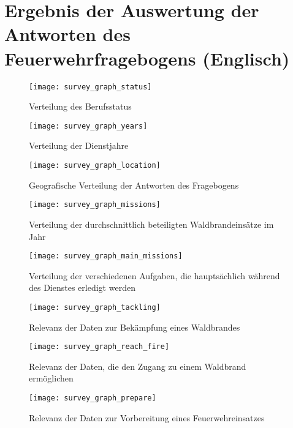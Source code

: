 \section{Ergebnis der Auswertung der Antworten des Feuerwehrfragebogens (Englisch)} \label{appendix:firefighter_survey}

\begin{figure}[H]
  \centering
  \texttt{[image: survey\_graph\_status]}
  \caption{Verteilung des Berufsstatus}
  \label{fig:survey_graph_status}
\end{figure}

\begin{figure}[H]
  \centering
  \texttt{[image: survey\_graph\_years]}
  \caption{Verteilung der Dienstjahre}
  \label{fig:survey_graph_years}
\end{figure}

\begin{figure}[H]
  \centering
  \texttt{[image: survey\_graph\_location]}
  \caption{Geografische Verteilung der Antworten des Fragebogens}
  \label{fig:survey_graph_location}
\end{figure}

\begin{figure}[H]
  \centering
  \texttt{[image: survey\_graph\_missions]}
  \caption{Verteilung der durchschnittlich beteiligten Waldbrandeinsätze im Jahr}
  \label{fig:survey_graph_missions}
\end{figure}

\begin{figure}[H]
  \centering
  \texttt{[image: survey\_graph\_main\_missions]}
  \caption{Verteilung der verschiedenen Aufgaben, die hauptsächlich während des Dienstes erledigt werden}
  \label{fig:survey_graph_main_missions}
\end{figure}

\begin{figure}[H]
  \centering
  \texttt{[image: survey\_graph\_tackling]}
  \caption{Relevanz der Daten zur Bekämpfung eines Waldbrandes}
  \label{fig:survey_graph_tackling}
\end{figure}

\begin{figure}[H]
  \centering
  \texttt{[image: survey\_graph\_reach\_fire]}
  \caption{Relevanz der Daten, die den Zugang zu einem Waldbrand ermöglichen}
  \label{fig:survey_graph_reach_fire}
\end{figure}

\begin{figure}[H]
  \centering
  \texttt{[image: survey\_graph\_prepare]}
  \caption{Relevanz der Daten zur Vorbereitung eines Feuerwehreinsatzes}
  \label{fig:survey_graph_prepare}
\end{figure}

